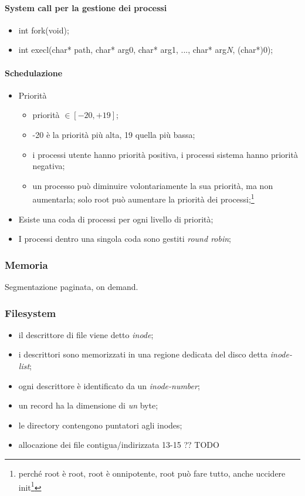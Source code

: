 \documentclass[12pt,a4paper]{article}
\begin{document}
\paragraph{System call per la gestione dei processi}
\begin{itemize}
  \item int fork(void);
  \item int execl(char* path, char* arg0, char* arg1, ..., char* arg\textit{N}, (char*)0);
\end{itemize}

\paragraph{Schedulazione}
\begin{itemize}
  \item Priorità
    \begin{itemize}
      \item priorità $ \in [-20, +19] $;
      \item -20 è la priorità più alta, 19 quella più bassa;
      \item i processi utente hanno priorità positiva, i processi
        sistema hanno priorità negativa;
      \item un processo può diminuire volontariamente la sua priorità,
        ma non aumentarla; solo root può aumentare la priorità dei
        processi;\footnote{perché root è root, root è onnipotente, root
        può fare tutto, anche uccidere init\footnote{non lo fare!}}
    \end{itemize}
  \item Esiste una coda di processi per ogni livello di priorità;
  \item I processi dentro una singola coda sono gestiti \emph{round robin};
\end{itemize}

\subsubsection{Memoria}
Segmentazione paginata, on demand.

\subsubsection{Filesystem}
\begin{itemize}
  \item il descrittore di file viene detto \emph{inode};
  \item i descrittori sono memorizzati in una regione dedicata del disco
    detta \emph{inode-list};
  \item ogni descrittore è identificato da un \emph{inode-number};
  \item un record ha la dimensione di \emph{un} byte;
  \item le directory contengono puntatori agli inodes;
  \item allocazione dei file contigua/indirizzata 13-15 ?? TODO %
\end{itemize}
\end{document}
